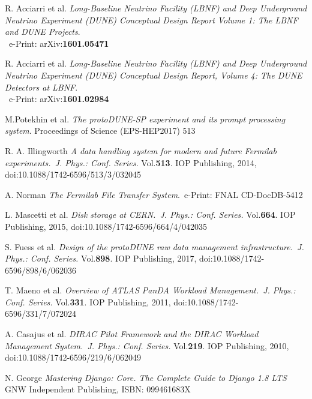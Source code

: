 \documentclass{webofc}
\begin{document}
\begin{thebibliography}{99}



R. Acciarri et al.
\emph{Long-Baseline Neutrino Facility (LBNF) and Deep Underground Neutrino Experiment (DUNE) Conceptual Design Report Volume 1: The LBNF and DUNE Projects}.\\ ~e-Print: arXiv:\textbf{1601.05471}

R. Acciarri et al.
\emph{Long-Baseline Neutrino Facility (LBNF) and Deep Underground Neutrino Experiment (DUNE) Conceptual Design Report, Volume 4: The DUNE Detectors at LBNF}.\\~e-Print: arXiv:\textbf{1601.02984}

 M.Potekhin et al. \emph{The protoDUNE-SP experiment and its prompt
processing system}. Proceedings of Science (EPS-HEP2017) 513



R. A. Illingworth \emph{A data handling system for modern and future Fermilab experiments.~J. Phys.: Conf. Series.} Vol.\textbf{513}. IOP Publishing, 2014,
doi:10.1088/1742-6596/513/3/032045

A. Norman \emph{The Fermilab File Transfer System}.~e-Print: FNAL CD-DocDB-5412

 L. Mascetti et al. \emph{Disk storage at CERN.~J. Phys.: Conf. Series.} Vol.\textbf{664}. IOP Publishing, 2015,
doi:10.1088/1742-6596/664/4/042035

S. Fuess et al. \emph{Design of the protoDUNE raw data management
infrastructure.~J. Phys.: Conf. Series.} Vol.\textbf{898}. IOP Publishing, 2017,
doi:10.1088/1742-6596/898/6/062036


T. Maeno et al. \emph{Overview of ATLAS PanDA Workload Management.~J. Phys.: Conf. Series.} Vol.\textbf{331}. IOP Publishing, 2011,
doi:10.1088/1742-6596/331/7/072024



A. Casajus et al.  \emph{DIRAC Pilot Framework and the DIRAC
Workload Management System.~J. Phys.: Conf. Series.} Vol.\textbf{219}. IOP Publishing, 2010,
doi:10.1088/1742-6596/219/6/062049

N. George \emph{Mastering Django: Core. The Complete Guide to Django 1.8 LTS}~ GNW Independent Publishing, ISBN: 099461683X



\end{thebibliography}
\end{document}
